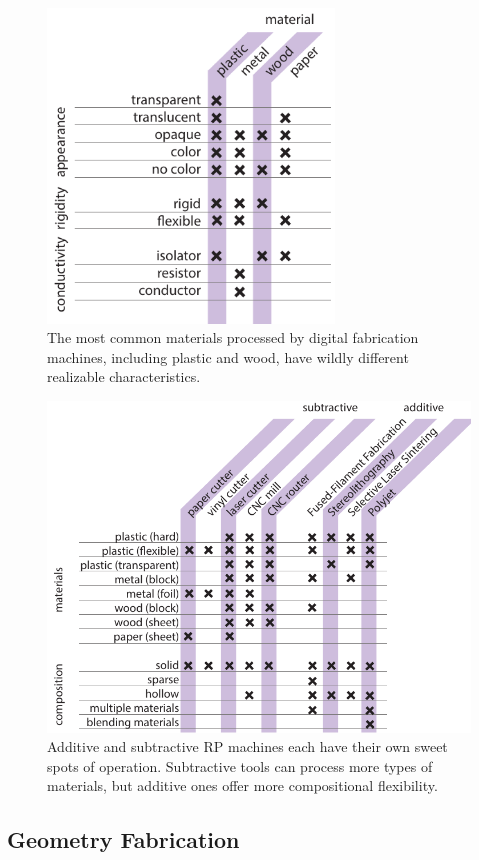 \begin{figure}
\centering
\includegraphics[width=3in]{figures/fab-properties.pdf}
\caption{The most common materials processed by digital fabrication machines, including plastic and wood, have wildly different realizable characteristics.}
\label{table:fab-properties}
\end{figure}

\begin{figure}
\centering
\includegraphics[width=5in]{figures/materials-machines.pdf}
\caption{Additive and subtractive RP machines each have their own sweet spots of operation. Subtractive tools can process more types of materials, but additive ones offer more compositional flexibility.}
\label{table:materials-machines}
\end{figure}

\subsection{Geometry Fabrication}

